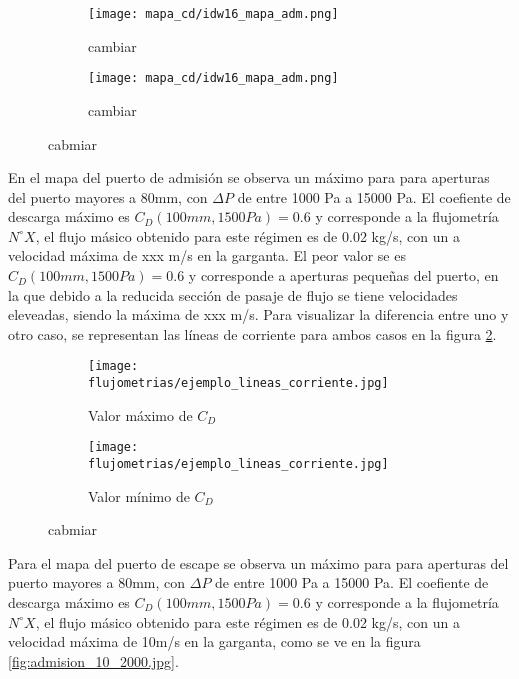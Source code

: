 \begin{figure}
    \centering
    \begin{subfigure}{0.4\textwidth}
        \centering
        \texttt{[image: mapa\_cd/idw16\_mapa\_adm.png]}
        \caption{cambiar}
    \end{subfigure}
    \hfill
    \begin{subfigure}{0.4\textwidth}
        \centering
        \texttt{[image: mapa\_cd/idw16\_mapa\_adm.png]}
        \caption{cambiar}
    \end{subfigure}
    \caption{cabmiar}\label{fig:mapa_cd_escape}
\end{figure}

En el mapa del puerto de admisión se observa un máximo para para aperturas del
puerto mayores a 80mm, con $\Delta P$ de entre 1000 Pa a 15000 Pa.
%
El coefiente de descarga máximo es $C_{D}(100mm, 1500Pa) = 0.6$ y corresponde a
la flujometría $N^{\circ} X$, el flujo másico obtenido para este régimen es de
0.02 kg/s, con un a velocidad máxima de xxx m/s en la garganta.
%
El peor valor se es $C_{D}(100mm, 1500Pa) = 0.6$ y corresponde a aperturas
pequeñas del puerto, en la que debido a la reducida sección de pasaje de flujo
se tiene velocidades eleveadas, siendo la máxima de xxx m/s.
%
Para visualizar la diferencia entre uno y otro caso, se representan las líneas
de corriente para ambos casos en la figura
\ref{fig:comparativa_lineas_corriente}.

\begin{figure}
    \centering
    \begin{subfigure}{0.4\textwidth}
        \centering
        \texttt{[image: flujometrias/ejemplo\_lineas\_corriente.jpg]}
        \caption{Valor máximo de $C_{D}$}
    \end{subfigure}
    \hfill
    \begin{subfigure}{0.4\textwidth}
        \centering
        \texttt{[image: flujometrias/ejemplo\_lineas\_corriente.jpg]}
        \caption{Valor mínimo de $C_{D}$}
    \end{subfigure}
    \caption{cabmiar}\label{fig:comparativa_lineas_corriente}
\end{figure}

Para el mapa del puerto de escape se observa un máximo para para aperturas del
puerto mayores a 80mm, con $\Delta P$ de entre 1000 Pa a 15000 Pa.
%
El coefiente de descarga máximo es $C_{D}(100mm, 1500Pa) = 0.6$ y corresponde a
la flujometría $N^{\circ} X$, el flujo másico obtenido para este régimen es de
0.02 kg/s, con un a velocidad máxima de 10m/s en la garganta, como se ve en la
figura \ref{fig:admision_10_2000.jpg}.

